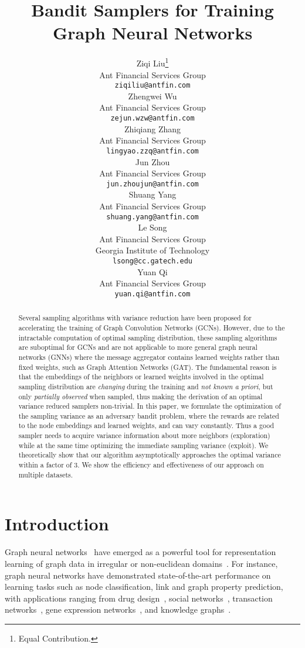\documentclass{article}
\title{\Large Bandit Samplers for Training Graph Neural Networks}
\author{Ziqi Liu\thanks{Equal Contribution.} \\
  Ant Financial Services Group \\
  \texttt{ziqiliu@antfin.com} \\
  \And
  Zhengwei Wu\samethanks \\
  Ant Financial Services Group \\
  \texttt{zejun.wzw@antfin.com} \\
  \AND
  Zhiqiang Zhang \\
  Ant Financial Services Group \\
  \texttt{lingyao.zzq@antfin.com} \\
  \And
  Jun Zhou \\
  Ant Financial Services Group \\
  \texttt{jun.zhoujun@antfin.com} \\
  \And
  Shuang Yang \\
  Ant Financial Services Group \\
  \texttt{shuang.yang@antfin.com} \\
  \And
  Le Song \\
  Ant Financial Services Group \\
  Georgia Institute of Technology \\
  \texttt{lsong@cc.gatech.edu} \\
  \And
  Yuan Qi \\
  Ant Financial Services Group \\
  \texttt{yuan.qi@antfin.com} 
}
\begin{document}
\maketitle

\begin{abstract}
Several sampling algorithms with variance reduction have been 
proposed for accelerating the training of Graph Convolution Networks (GCNs). 
However, due to the intractable computation of optimal sampling distribution,
these sampling algorithms are suboptimal for GCNs and are not
applicable to more general graph neural networks (GNNs) where 
the message aggregator contains learned weights rather than
fixed weights, such as Graph Attention Networks (GAT). 
The fundamental reason is that the embeddings of the neighbors or learned weights involved in the optimal sampling distribution
are \emph{changing} during the training and \emph{not known a priori}, 
but only \emph{partially observed} when sampled, thus 
making the derivation of an optimal variance reduced samplers non-trivial. 
In this paper, we formulate the optimization of the sampling 
variance as an adversary bandit problem, where the rewards are related to the node embeddings and learned weights, 
and can vary constantly. Thus a good sampler needs to acquire 
variance information about more neighbors (exploration) while at the same time optimizing the immediate sampling variance (exploit). We theoretically
show that our algorithm asymptotically approaches the optimal variance within a factor of 3. We show the efficiency and effectiveness of our approach on multiple
datasets.
\end{abstract}

\section{Introduction}
Graph neural networks~\cite{kipf2016semi,hamilton2017inductive} have emerged as a powerful tool for 
representation learning of 
graph data in irregular or non-euclidean 
domains~\citep{battaglia2018relational,wu2019comprehensive}. 
For instance, graph neural networks have demonstrated 
state-of-the-art performance on learning tasks
such as node classification, link and graph property 
prediction, with applications ranging from drug 
design~\cite{dai2016discriminative}, 
social networks~\cite{hamilton2017inductive}, 
transaction networks~\cite{liu2018heterogeneous}, 
gene expression networks~\cite{fout2017protein}, and 
knowledge graphs~\cite{schlichtkrull2018modeling}.
\end{document}
